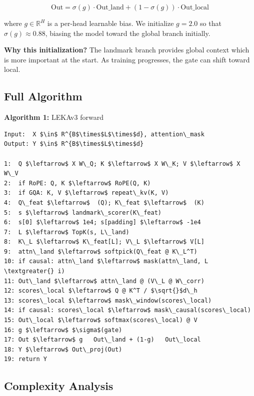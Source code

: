 \[
\text{Out} = \sigma(g) \cdot \text{Out}\_\text{land} + (1 - \sigma(g)) \cdot \text{Out}\_\text{local}
\tag{4.16}
\]

where $g \in \mathbb{R}^H$ is a per-head learnable bias. We initialize 
$g = 2.0$ so that $\sigma(g) \approx 0.88$, biasing the model toward the 
global branch initially.

\textbf{Why this initialization?} The landmark branch provides global context 
which is more important at the start. As training progresses, the gate can 
shift toward local.

\subsection{Full Algorithm}

\textbf{Algorithm 1:} LEKAv3 forward
\begin{lstlisting}
Input:  X $\in$ R^{B$\times$L$\times$d}, attention\_mask
Output: Y $\in$ R^{B$\times$L$\times$d}

1:  Q $\leftarrow$ X W\_Q; K $\leftarrow$ X W\_K; V $\leftarrow$ X W\_V
2:  if RoPE: Q, K $\leftarrow$ RoPE(Q, K)
3:  if GQA: K, V $\leftarrow$ repeat\_kv(K, V)
4:  Q\_feat $\leftarrow$  (Q); K\_feat $\leftarrow$  (K)
5:  s $\leftarrow$ landmark\_scorer(K\_feat)
6:  s[0] $\leftarrow$ 1e4; s[padding] $\leftarrow$ -1e4
7:  L $\leftarrow$ TopK(s, L\_land)
8:  K\_L $\leftarrow$ K\_feat[L]; V\_L $\leftarrow$ V[L]
9:  attn\_land $\leftarrow$ softpick(Q\_feat @ K\_L^T)
10: if causal: attn\_land $\leftarrow$ mask(attn\_land, L \textgreater{} i)
11: Out\_land $\leftarrow$ attn\_land @ (V\_L @ W\_corr)
12: scores\_local $\leftarrow$ Q @ K^T / $\sqrt{}$d\_h
13: scores\_local $\leftarrow$ mask\_window(scores\_local)
14: if causal: scores\_local $\leftarrow$ mask\_causal(scores\_local)
15: Out\_local $\leftarrow$ softmax(scores\_local) @ V
16: g $\leftarrow$ $\sigma$(gate)
17: Out $\leftarrow$ g   Out\_land + (1-g)   Out\_local
18: Y $\leftarrow$ Out\_proj(Out)
19: return Y
\end{lstlisting}

\subsection{Complexity Analysis}


